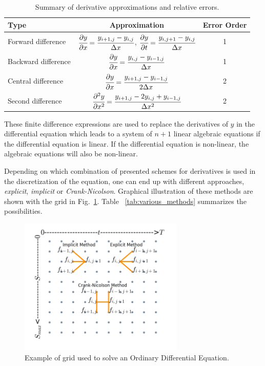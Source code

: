 \begin{table}[htb]
    \centering
    \begin{tabular}{|l|c|c|}
    \hline
    Type & Approximation & Error Order \\
    \hline
    Forward difference & $\cfrac{\partial y}{\partial x} = \cfrac{y_{i+1,j}-y_{i,j}}{\Delta x}$, $\cfrac{\partial y}{\partial t} = \cfrac{y_{i,j+1}-y_{i,j}}{\Delta x}$ & 1 \\[1ex]
    \hline
    Backward difference & $\cfrac{\partial y}{\partial x} = \cfrac{y_{i,j}-y_{i-1,j}}{\Delta x}$ & 1 \\[1ex]
    \hline
    Central difference & $\cfrac{\partial y}{\partial x} = \cfrac{y_{i+1,j}-y_{i-1,j}}{2\Delta x}$& 2 \\[1ex]
    \hline
    Second difference & $\cfrac{\partial^2 y}{\partial x^2} = \cfrac{y_{i+1,j}-2y_{i,j} + y_{i-1,j}}{\Delta x^2}$& 2 \\[1ex]
    \hline
    \end{tabular}
\caption{Summary of derivative approximations and relative errors.}
\label{tab:derivative_approximations}
\end{table}

These finite difference expressions are used to replace the derivatives of $y$ in the differential equation which leads to a system of $n+1$ linear algebraic equations if the differential equation is linear. If the differential equation is non-linear, the algebraic equations will also be non-linear.

Depending on which combination of presented schemes for derivatives is used in the discretization of the equation, one can end up with different approaches, \emph{explicit}, \emph{implicit} or \emph{Crank-Nicolson}. Graphical illustration of these methods are shown with the grid in Fig.~\ref{fig:grid_finite_difference}. 
Table ~\ref{tab:various_methods} summarizes the possibilities.

\begin{figure}[htb]
	\centering
	\includegraphics[width=0.7\textwidth]{figures/grid_finite_differences}
	\caption{Example of grid used to solve an Ordinary Differential Equation.}
	\label{fig:grid_finite_difference}
\end{figure} 

